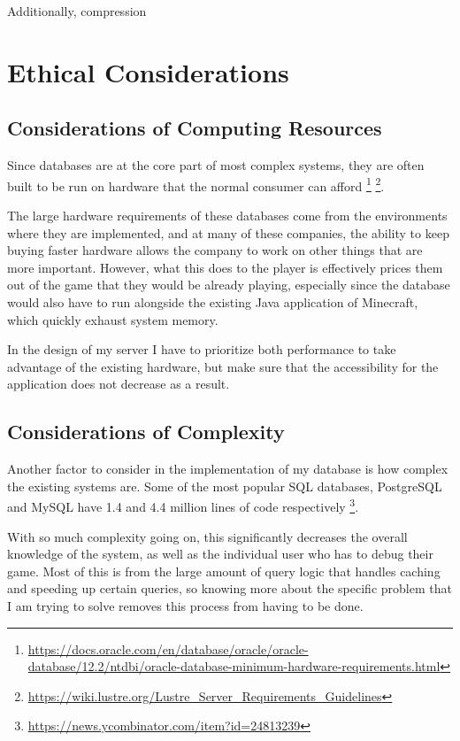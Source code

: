 \documentclass[10pt,twocolumn]{article}
\begin{document}
Additionally, compression 

\section{Ethical Considerations}

\subsection{Considerations of Computing Resources}

Since databases are at the core part of most complex systems, they are often
built to be run on hardware that the normal consumer can afford
\footnote{\url{https://docs.oracle.com/en/database/oracle/oracle-database/12.2/ntdbi/oracle-database-minimum-hardware-requirements.html}}
\footnote{\url{https://wiki.lustre.org/Lustre_Server_Requirements_Guidelines}}.

The large hardware requirements of these databases come from the environments
where they are implemented, and at many of these companies, the ability to
keep buying faster hardware allows the company to work on other things that are
more important. However, what this does to the player is effectively prices them
out of the game that they would be already playing, especially since the
database would also have to run alongside the existing Java application of
Minecraft, which quickly exhaust system memory.

In the design of my server I have to prioritize both performance to take
advantage of the existing hardware, but make sure that the accessibility for
the application does not decrease as a result.

\subsection{Considerations of Complexity}
Another factor to consider in the implementation of my database is how complex
the existing systems are. Some of the most popular SQL databases, PostgreSQL and
MySQL have 1.4 and 4.4 million lines of code respectively
\footnote{\url{https://news.ycombinator.com/item?id=24813239}}.

With so much complexity going on, this significantly decreases the overall
knowledge of the system, as well as the individual user who has to debug their
game. Most of this is from the large amount of query logic that handles caching
and speeding up certain queries, so knowing more about the specific problem that
I am trying to solve removes this process from having to be done.
\end{document}
